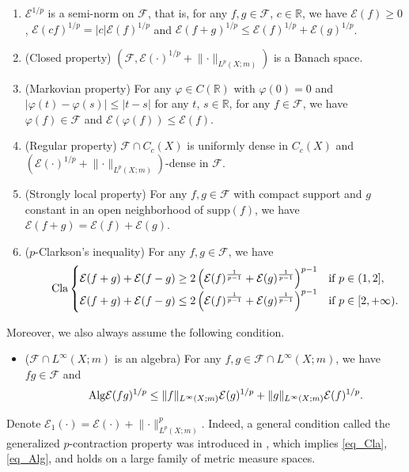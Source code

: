 \documentclass[11pt,a4paper]{article}
\numberwithin{equation}{section}
\theoremstyle{plain}
\theoremstyle{definition}
\begin{document}
\begin{enumerate}[label=(\arabic*)]
\item $\mathcal{E}^{1/p}$ is a semi-norm on $\mathcal{F}$, that is, for any $f,g\in\mathcal{F}$, $c\in\mathbb{R}$, we have $\mathcal{E}(f)\ge0$, $\mathcal{E}(cf)^{1/p}=|c|\mathcal{E}(f)^{1/p}$ and $\mathcal{E}(f+g)^{1/p}\le\mathcal{E}(f)^{1/p}+\mathcal{E}(g)^{1/p}$.
\item (Closed property) $(\mathcal{F},\mathcal{E}(\cdot)^{1/p}+\lVert {\cdot}\rVert_{L^p(X;m)})$ is a Banach space.
\item (Markovian property) For any $\varphi\in C(\mathbb{R})$ with $\varphi(0)=0$ and $|\varphi(t)-\varphi(s)|\le|t-s|$ for any $t$, $s\in\mathbb{R}$, for any $f\in\mathcal{F}$, we have $\varphi(f)\in\mathcal{F}$ and $\mathcal{E}(\varphi(f))\le\mathcal{E}(f)$.
\item (Regular property) $\mathcal{F}\cap C_c(X)$ is uniformly dense in $C_c(X)$ and $(\mathcal{E}(\cdot)^{1/p}+\lVert {\cdot}\rVert_{L^p(X;m)})$-dense in $\mathcal{F}$.
\item (Strongly local property) For any $f,g\in\mathcal{F}$ with compact support and $g$ constant in an open neighborhood of $\mathrm{supp}(f)$, we have $\mathcal{E}(f+g)=\mathcal{E}(f)+\mathcal{E}(g)$.
\item ($p$-Clarkson's inequality) For any $f,g\in\mathcal{F}$, we have
\begin{equation*}\label{eq_Cla}\tag*{$\text{Cla}$}
\begin{cases}
\mathcal{E}(f+g)+\mathcal{E}(f-g)\ge2 \left(\mathcal{E}(f)^{\frac{1}{p-1}}+\mathcal{E}(g)^{\frac{1}{p-1}}\right)^{p-1}&\text{if }p\in(1,2],\\
\mathcal{E}(f+g)+\mathcal{E}(f-g)\le2 \left(\mathcal{E}(f)^{\frac{1}{p-1}}+\mathcal{E}(g)^{\frac{1}{p-1}}\right)^{p-1}&\text{if }p\in[2,+\infty).\\
\end{cases}
\end{equation*}
\end{enumerate}
Moreover, we also always assume the following condition.
\begin{itemize}
\item ($\mathcal{F}\cap L^\infty(X;m)$ is an algebra) For any $f,g\in\mathcal{F}\cap L^\infty(X;m)$, we have $fg\in\mathcal{F}$ and
\begin{equation*}\label{eq_Alg}\tag*{$\text{Alg}$}
\mathcal{E}(fg)^{{1}/{p}}\le \lVert {f}\rVert_{L^\infty(X;m)}\mathcal{E}(g)^{1/p}+\lVert {g}\rVert_{L^\infty(X;m)}\mathcal{E}(f)^{1/p}.
\end{equation*}
\end{itemize}
Denote $\mathcal{E}_1(\cdot)=\mathcal{E}(\cdot)+\lVert {\cdot}\rVert^p_{L^p(X;m)}$. Indeed, a general condition called the generalized $p$-contraction property was introduced in \cite{KS24a}, which implies \ref{eq_Cla}, \ref{eq_Alg}, and holds on a large family of metric measure spaces.
\end{document}
